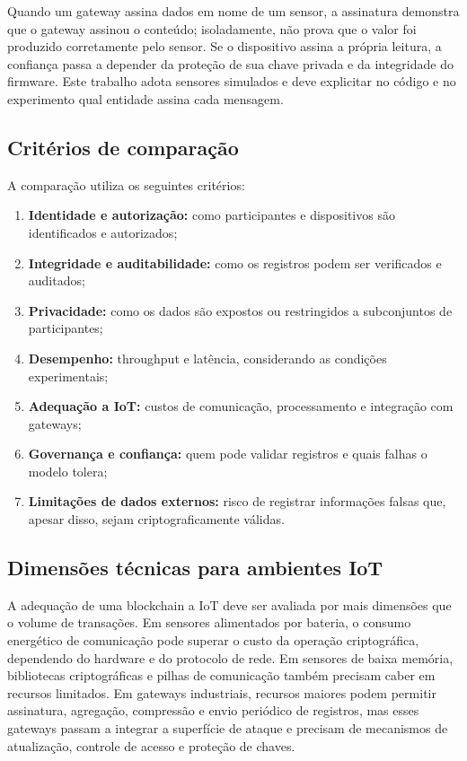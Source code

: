 \documentclass[10pt,a4paper,twocolumn]{article}
\begin{document}
Quando um gateway assina dados em nome de um sensor, a assinatura demonstra que o gateway assinou o conteúdo; isoladamente, não prova que o valor foi produzido corretamente pelo sensor. Se o dispositivo assina a própria leitura, a confiança passa a depender da proteção de sua chave privada e da integridade do firmware. Este trabalho adota sensores simulados e deve explicitar no código e no experimento qual entidade assina cada mensagem.

\subsection{Critérios de comparação}
A comparação utiliza os seguintes critérios:
\begin{enumerate}
  \item \textbf{Identidade e autorização:} como participantes e dispositivos são identificados e autorizados;
  \item \textbf{Integridade e auditabilidade:} como os registros podem ser verificados e auditados;
  \item \textbf{Privacidade:} como os dados são expostos ou restringidos a subconjuntos de participantes;
  \item \textbf{Desempenho:} throughput e latência, considerando as condições experimentais;
  \item \textbf{Adequação a IoT:} custos de comunicação, processamento e integração com gateways;
  \item \textbf{Governança e confiança:} quem pode validar registros e quais falhas o modelo tolera;
  \item \textbf{Limitações de dados externos:} risco de registrar informações falsas que, apesar disso, sejam criptograficamente válidas.
\end{enumerate}


\subsection{Dimensões técnicas para ambientes IoT}
A adequação de uma blockchain a IoT deve ser avaliada por mais dimensões que o volume de transações. Em sensores alimentados por bateria, o consumo energético de comunicação pode superar o custo da operação criptográfica, dependendo do hardware e do protocolo de rede. Em sensores de baixa memória, bibliotecas criptográficas e pilhas de comunicação também precisam caber em recursos limitados. Em gateways industriais, recursos maiores podem permitir assinatura, agregação, compressão e envio periódico de registros, mas esses gateways passam a integrar a superfície de ataque e precisam de mecanismos de atualização, controle de acesso e proteção de chaves.
\end{document}
